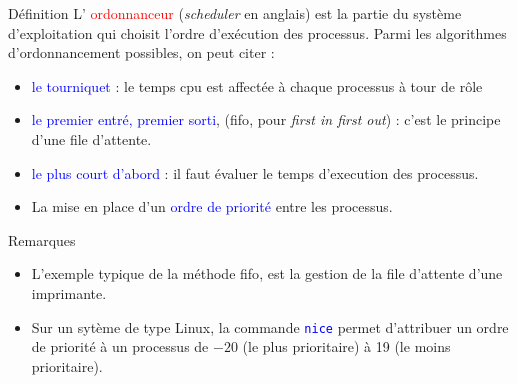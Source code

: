 \documentclass[10pt]{beamer}
\begin{document}
\begin{frame}
	\mframe{\Processus}
	\begin{alertblock}{Définition}
		L' \textcolor{red}{ordonnanceur} (\textit{scheduler} en anglais) est la partie du système d'exploitation qui choisit l'ordre d'exécution des processus. Parmi les algorithmes d'ordonnancement possibles, on peut citer :
		\begin{itemize}[label=\textbullet]
			\item<2-> \textcolor{blue}{le tourniquet} : le temps {\sc cpu} est affectée à chaque processus à tour de rôle
			\item<3-> \textcolor{blue}{le premier entré, premier sorti}, ({\sc fifo}, pour \textit{first in first out}) : c'est le principe d'une file d'attente.
			\item<4-> \textcolor{blue}{le plus court d'abord} : il faut évaluer le temps d'execution des processus.
			\item<5-> La mise en place d'un \textcolor{blue}{ordre de priorité} entre les processus.
		\end{itemize}
	\end{alertblock}
	\begin{block}{Remarques}
		\begin{itemize}
			\item<6-> L'exemple typique de la méthode {\sc fifo}, est la gestion de la file d'attente d'une imprimante.
			\item<7-> Sur un sytème de type Linux, la commande \textcolor{blue}{\tt nice} permet d'attribuer un ordre de priorité à un processus de $-20$ (le plus prioritaire) à 19 (le moins prioritaire).
		\end{itemize}
	\end{block}
\end{frame}
\end{document}
